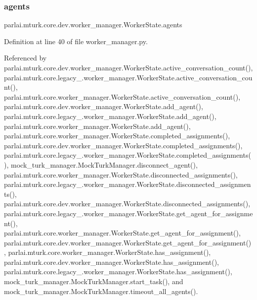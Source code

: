 \subsubsection{\texorpdfstring{agents}{agents}}
{\footnotesize\ttfamily parlai.\+mturk.\+core.\+dev.\+worker\+\_\+manager.\+Worker\+State.\+agents}



Definition at line 40 of file worker\+\_\+manager.\+py.



Referenced by parlai.\+mturk.\+core.\+dev.\+worker\+\_\+manager.\+Worker\+State.\+active\+\_\+conversation\+\_\+count(), parlai.\+mturk.\+core.\+legacy\+\_.\+worker\+\_\+manager.\+Worker\+State.\+active\+\_\+conversation\+\_\+count(), parlai.\+mturk.\+core.\+worker\+\_\+manager.\+Worker\+State.\+active\+\_\+conversation\+\_\+count(), parlai.\+mturk.\+core.\+dev.\+worker\+\_\+manager.\+Worker\+State.\+add\+\_\+agent(), parlai.\+mturk.\+core.\+legacy\+\_.\+worker\+\_\+manager.\+Worker\+State.\+add\+\_\+agent(), parlai.\+mturk.\+core.\+worker\+\_\+manager.\+Worker\+State.\+add\+\_\+agent(), parlai.\+mturk.\+core.\+worker\+\_\+manager.\+Worker\+State.\+completed\+\_\+assignments(), parlai.\+mturk.\+core.\+dev.\+worker\+\_\+manager.\+Worker\+State.\+completed\+\_\+assignments(), parlai.\+mturk.\+core.\+legacy\+\_.\+worker\+\_\+manager.\+Worker\+State.\+completed\+\_\+assignments(), mock\+\_\+turk\+\_\+manager.\+Mock\+Turk\+Manager.\+disconnect\+\_\+agent(), parlai.\+mturk.\+core.\+worker\+\_\+manager.\+Worker\+State.\+disconnected\+\_\+assignments(), parlai.\+mturk.\+core.\+legacy\+\_.\+worker\+\_\+manager.\+Worker\+State.\+disconnected\+\_\+assignments(), parlai.\+mturk.\+core.\+dev.\+worker\+\_\+manager.\+Worker\+State.\+disconnected\+\_\+assignments(), parlai.\+mturk.\+core.\+legacy\+\_.\+worker\+\_\+manager.\+Worker\+State.\+get\+\_\+agent\+\_\+for\+\_\+assignment(), parlai.\+mturk.\+core.\+worker\+\_\+manager.\+Worker\+State.\+get\+\_\+agent\+\_\+for\+\_\+assignment(), parlai.\+mturk.\+core.\+dev.\+worker\+\_\+manager.\+Worker\+State.\+get\+\_\+agent\+\_\+for\+\_\+assignment(), parlai.\+mturk.\+core.\+worker\+\_\+manager.\+Worker\+State.\+has\+\_\+assignment(), parlai.\+mturk.\+core.\+dev.\+worker\+\_\+manager.\+Worker\+State.\+has\+\_\+assignment(), parlai.\+mturk.\+core.\+legacy\+\_.\+worker\+\_\+manager.\+Worker\+State.\+has\+\_\+assignment(), mock\+\_\+turk\+\_\+manager.\+Mock\+Turk\+Manager.\+start\+\_\+task(), and mock\+\_\+turk\+\_\+manager.\+Mock\+Turk\+Manager.\+timeout\+\_\+all\+\_\+agents().

